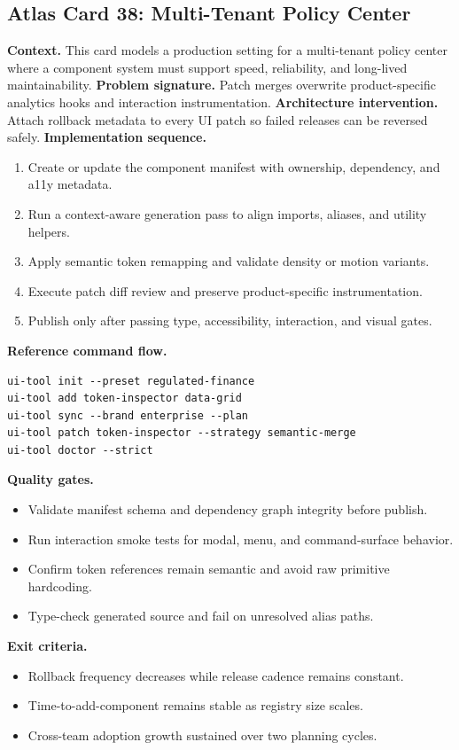 \subsection*{Atlas Card 38: Multi-Tenant Policy Center}
\textbf{Context.} This card models a production setting for a multi-tenant policy center where a component system must support speed, reliability, and long-lived maintainability.
\textbf{Problem signature.} Patch merges overwrite product-specific analytics hooks and interaction instrumentation.
\textbf{Architecture intervention.} Attach rollback metadata to every UI patch so failed releases can be reversed safely.
\textbf{Implementation sequence.}
\begin{enumerate}[leftmargin=*, itemsep=0.28em]
  \item Create or update the component manifest with ownership, dependency, and a11y metadata.
  \item Run a context-aware generation pass to align imports, aliases, and utility helpers.
  \item Apply semantic token remapping and validate density or motion variants.
  \item Execute patch diff review and preserve product-specific instrumentation.
  \item Publish only after passing type, accessibility, interaction, and visual gates.
\end{enumerate}
\textbf{Reference command flow.}
\begin{verbatim}
ui-tool init --preset regulated-finance
ui-tool add token-inspector data-grid
ui-tool sync --brand enterprise --plan
ui-tool patch token-inspector --strategy semantic-merge
ui-tool doctor --strict
\end{verbatim}
\textbf{Quality gates.}
\begin{itemize}[leftmargin=*, itemsep=0.24em]
  \item Validate manifest schema and dependency graph integrity before publish.
  \item Run interaction smoke tests for modal, menu, and command-surface behavior.
  \item Confirm token references remain semantic and avoid raw primitive hardcoding.
  \item Type-check generated source and fail on unresolved alias paths.
\end{itemize}
\textbf{Exit criteria.}
\begin{itemize}[leftmargin=*, itemsep=0.24em]
  \item Rollback frequency decreases while release cadence remains constant.
  \item Time-to-add-component remains stable as registry size scales.
  \item Cross-team adoption growth sustained over two planning cycles.
\end{itemize}
\clearpage
